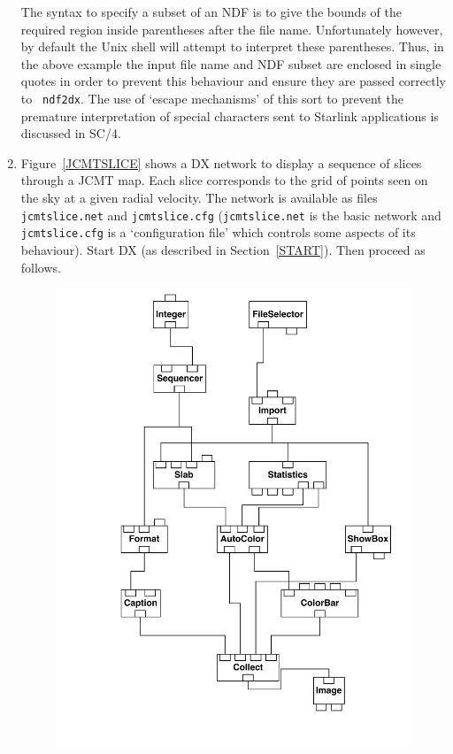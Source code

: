 \documentclass[twoside,11pt]{article}
\newcommand{\xref}[3]{#1}
\begin{document}
\begin{enumerate}
   The syntax to specify a subset of an NDF is to give the bounds of
   the required region inside parentheses after the file name.
   Unfortunately however, by default the Unix shell will attempt to
   interpret these parentheses.  Thus, in the above example the input
   file name and NDF subset are enclosed in single quotes in order to
   prevent this behaviour and ensure they are passed correctly to {\tt
   ndf2dx}.  The use of `escape mechanisms'  of this sort to prevent the
   premature interpretation of special characters sent to Starlink
   applications is discussed in \xref{SC/4}{sc4}{sc4_se_spec_char}\cite{SC4}.

  \item Figure~\ref{JCMTSLICE} shows a DX network to display a sequence
   of slices through a JCMT map.  Each slice corresponds to the grid
   of points seen on the sky at a given radial velocity.  The network
   is available as files {\tt jcmtslice.net} and {\tt jcmtslice.cfg}
   ({\tt jcmtslice.net} is the basic network and {\tt jcmtslice.cfg} is
   a `configuration file' which controls some aspects of its behaviour).
   Start DX (as described in Section~\ref{START}).  Then proceed as
   follows.

  \begin{figure}[htbp]

  \begin{center}
  \leavevmode
  \includegraphics[width=450pt]{sc2_jcmtslice}
  \end{center}


\end{figure}
\end{enumerate}
\end{document}
